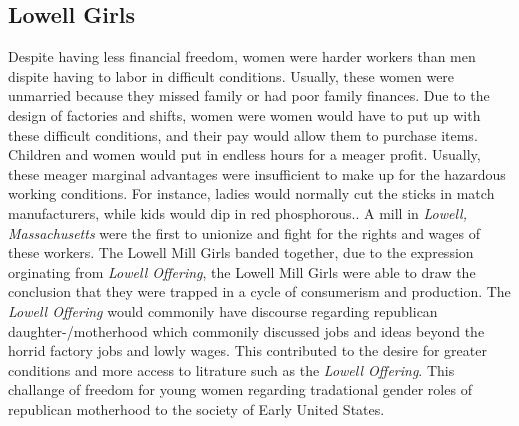 \documentclass{article}
\begin{document}
\subsection{Lowell Girls}
Despite having less financial freedom, women were harder workers than men dispite having to labor in difficult conditions. Usually, these women were unmarried because they missed family or had poor family finances. Due to the design of factories and shifts, women were  women would have to put up with these difficult conditions, and their pay would allow them to purchase items. Children and women would put in endless hours for a meager profit. Usually, these meager marginal advantages were insufficient to make up for the hazardous working conditions. For instance, ladies would normally cut the sticks in match manufacturers, while kids would dip in red phosphorous.\citep[117]{stansell1982}. A mill in \emph{Lowell, Massachusetts} were the first to unionize and fight for the rights and wages of these workers. The Lowell Mill Girls banded together, due to the expression orginating from \emph{Lowell Offering}, the Lowell Mill Girls were able to draw the conclusion that they were trapped in a cycle of consumerism and production. The \emph{Lowell Offering} would commonily have discourse regarding republican daughter-/motherhood which commonily discussed jobs and ideas beyond the horrid factory jobs and lowly wages. \parencite{kanzler2005} This contributed to the desire for greater conditions and more access to litrature such as the \emph{Lowell Offering}. This challange of freedom for young women regarding tradational gender roles of republican motherhood to the society of Early United States.
\end{document}
